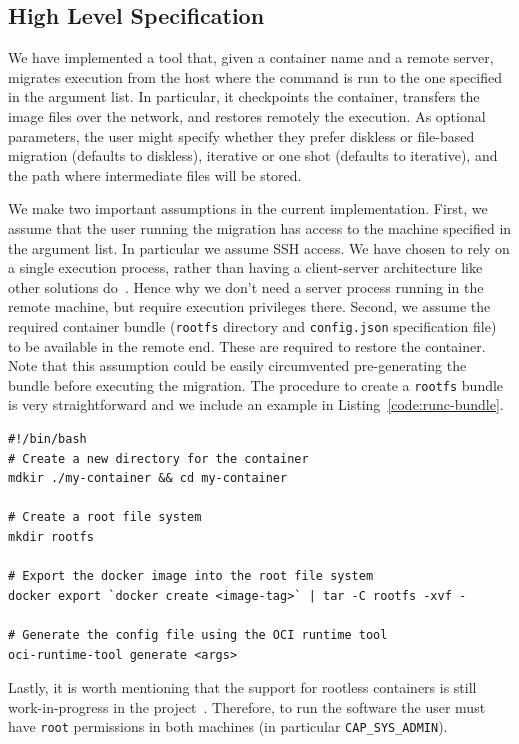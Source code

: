 \subsection{High Level Specification}

We have implemented a tool that, given a container name and a remote server, migrates execution from the host where the command is run to the one specified in the argument list.
In particular, it checkpoints the container, transfers the image files over the network, and restores remotely the execution.
As optional parameters, the user might specify whether they prefer diskless or file-based migration (defaults to diskless), iterative or one shot (defaults to iterative), and the path where intermediate files will be stored.

We make two important assumptions in the current implementation.
First, we assume that the user running the migration has access to the machine specified in the argument list.
In particular we assume SSH access.
We have chosen to rely on a single execution process, rather than having a client-server architecture like other solutions do~\cite{criu-phaul}.
Hence why we don't need a server process running in the remote machine, but require execution privileges there.
Second, we assume the required container bundle (\texttt{rootfs} directory and \texttt{config.json} specification file) to be available in the remote end.
These are required to restore the container.
Note that this assumption could be easily circumvented pre-generating the bundle before executing the migration.
The procedure to create a \texttt{rootfs} bundle is very straightforward and we include an example in Listing~\ref{code:runc-bundle}.
\begin{lstlisting}[style=Bash,caption={Commands to generate an OCI bundle to run a container using \runc.},label={code:runc-bundle}]
#!/bin/bash
# Create a new directory for the container
mdkir ./my-container && cd my-container

# Create a root file system
mkdir rootfs

# Export the docker image into the root file system
docker export `docker create <image-tag>` | tar -C rootfs -xvf -

# Generate the config file using the OCI runtime tool
oci-runtime-tool generate <args>
\end{lstlisting}
Lastly, it is worth mentioning that the support for rootless containers is still work-in-progress in the \criu project~\cite{criu-user-mode}.
Therefore, to run the software the user must have \texttt{root} permissions in both machines (in particular \texttt{CAP\_SYS\_ADMIN}).

